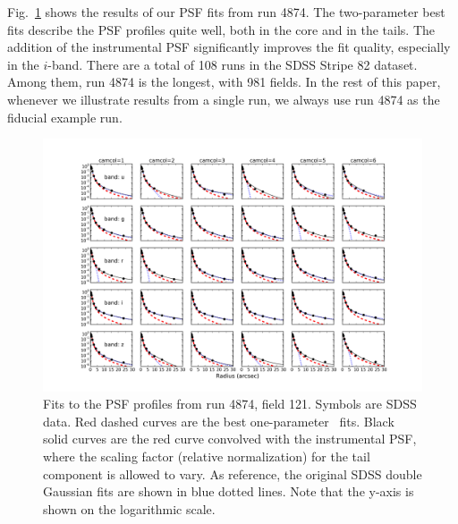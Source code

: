 Fig.~\ref{fig:psffit} shows the results of our PSF fits from run 4874. The two-parameter
best fits describe the PSF profiles quite well, both in the core and
in the tails. 
The addition of the instrumental PSF 
  significantly improves the fit quality, especially in the $i$-band. 
There are 
a total of 108 runs in the SDSS Stripe 82 dataset. Among them, run 4874 is the longest, 
with 981 fields. In the rest of this paper, whenever we illustrate results from a single run, 
we always use run 4874 as the fiducial example run. 


\begin{figure}[th]
\centering
\includegraphics[width=1.0\textwidth]{FIGURES/psffit.png}
\vskip -0.3in
\caption{Fits to the PSF profiles from run 4874, field 121. Symbols are SDSS data. 
  Red dashed curves are the best one-parameter \vk~fits. Black solid curves are the red
  curve convolved with the instrumental PSF, where the scaling factor
  (relative normalization) 
  for the tail component is allowed to vary. 
As reference, the original SDSS double Gaussian fits are shown in blue
dotted lines.
Note that the y-axis 
  is shown on the logarithmic scale.
\label{fig:psffit}}
\end{figure}


